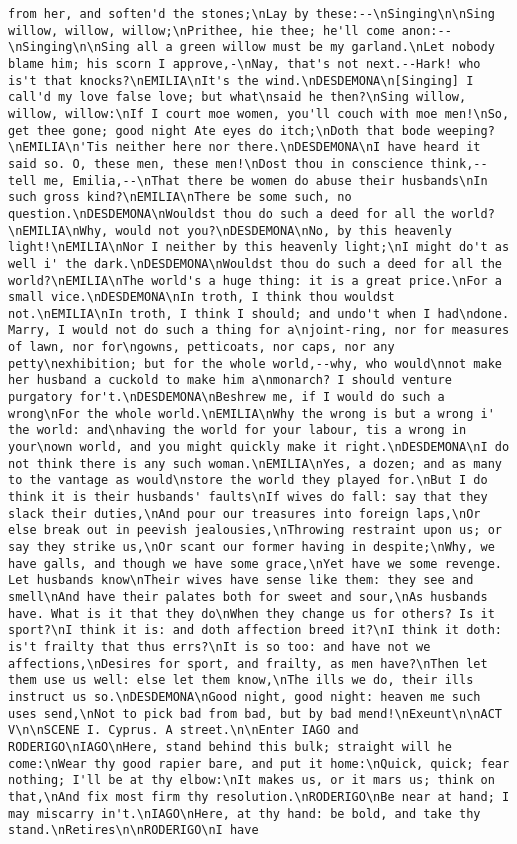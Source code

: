 \begin{verbatim}
from her, and soften'd the stones;\nLay by these:--\nSinging\n\nSing willow, willow, willow;\nPrithee, hie thee; he'll come anon:--\nSinging\n\nSing all a green willow must be my garland.\nLet nobody blame him; his scorn I approve,-\nNay, that's not next.--Hark! who is't that knocks?\nEMILIA\nIt's the wind.\nDESDEMONA\n[Singing] I call'd my love false love; but what\nsaid he then?\nSing willow, willow, willow:\nIf I court moe women, you'll couch with moe men!\nSo, get thee gone; good night Ate eyes do itch;\nDoth that bode weeping?\nEMILIA\n'Tis neither here nor there.\nDESDEMONA\nI have heard it said so. O, these men, these men!\nDost thou in conscience think,--tell me, Emilia,--\nThat there be women do abuse their husbands\nIn such gross kind?\nEMILIA\nThere be some such, no question.\nDESDEMONA\nWouldst thou do such a deed for all the world?\nEMILIA\nWhy, would not you?\nDESDEMONA\nNo, by this heavenly light!\nEMILIA\nNor I neither by this heavenly light;\nI might do't as well i' the dark.\nDESDEMONA\nWouldst thou do such a deed for all the world?\nEMILIA\nThe world's a huge thing: it is a great price.\nFor a small vice.\nDESDEMONA\nIn troth, I think thou wouldst not.\nEMILIA\nIn troth, I think I should; and undo't when I had\ndone. Marry, I would not do such a thing for a\njoint-ring, nor for measures of lawn, nor for\ngowns, petticoats, nor caps, nor any petty\nexhibition; but for the whole world,--why, who would\nnot make her husband a cuckold to make him a\nmonarch? I should venture purgatory for't.\nDESDEMONA\nBeshrew me, if I would do such a wrong\nFor the whole world.\nEMILIA\nWhy the wrong is but a wrong i' the world: and\nhaving the world for your labour, tis a wrong in your\nown world, and you might quickly make it right.\nDESDEMONA\nI do not think there is any such woman.\nEMILIA\nYes, a dozen; and as many to the vantage as would\nstore the world they played for.\nBut I do think it is their husbands' faults\nIf wives do fall: say that they slack their duties,\nAnd pour our treasures into foreign laps,\nOr else break out in peevish jealousies,\nThrowing restraint upon us; or say they strike us,\nOr scant our former having in despite;\nWhy, we have galls, and though we have some grace,\nYet have we some revenge. Let husbands know\nTheir wives have sense like them: they see and smell\nAnd have their palates both for sweet and sour,\nAs husbands have. What is it that they do\nWhen they change us for others? Is it sport?\nI think it is: and doth affection breed it?\nI think it doth: is't frailty that thus errs?\nIt is so too: and have not we affections,\nDesires for sport, and frailty, as men have?\nThen let them use us well: else let them know,\nThe ills we do, their ills instruct us so.\nDESDEMONA\nGood night, good night: heaven me such uses send,\nNot to pick bad from bad, but by bad mend!\nExeunt\n\nACT V\n\nSCENE I. Cyprus. A street.\n\nEnter IAGO and RODERIGO\nIAGO\nHere, stand behind this bulk; straight will he come:\nWear thy good rapier bare, and put it home:\nQuick, quick; fear nothing; I'll be at thy elbow:\nIt makes us, or it mars us; think on that,\nAnd fix most firm thy resolution.\nRODERIGO\nBe near at hand; I may miscarry in't.\nIAGO\nHere, at thy hand: be bold, and take thy stand.\nRetires\n\nRODERIGO\nI have 
\end{verbatim}
